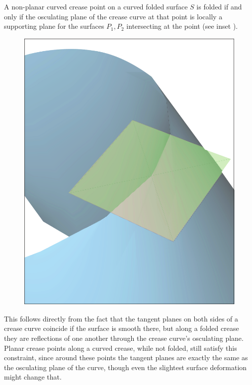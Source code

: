 \begin{theorem}\label{Thm:supporting_plane}
A non-planar curved crease point on a curved folded surface $S$ is folded if and only if the osculating plane of the crease curve at that point is locally a supporting plane for the surfaces $P_1,P_2$ intersecting at the point (see inset ).
\end{theorem}
\setlength{\columnsep}{8pt}%
\begin{figure}
  \centering
  \includegraphics[width=\linewidth]{figures/plane_side}
\end{figure}
This follows directly from the fact that the tangent planes on both sides of a crease curve coincide if the surface is smooth there, but along a folded crease they are reflections of one another through the crease curve's osculating plane. Planar crease points along a curved crease, while not folded, still satisfy this constraint, since around these points the tangent planes are exactly the same as the osculating plane of the curve, though even the slightest surface deformation might change that. 

